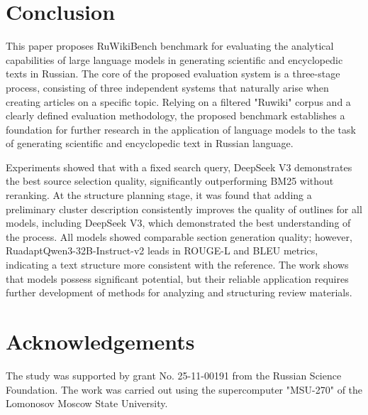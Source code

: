 \documentclass{superfri}
\begin{document}
\section*{Conclusion}
This paper proposes RuWikiBench benchmark for evaluating the analytical capabilities of large language models in generating scientific and encyclopedic texts in Russian. 
The core of the proposed evaluation system is a three-stage process, consisting of three independent systems that naturally arise when creating articles on a specific topic. 
Relying on a filtered "Ruwiki" corpus and a clearly defined evaluation methodology, the proposed benchmark establishes a foundation for further research in the application of language models to the 
task of generating scientific and encyclopedic text in Russian language.

Experiments showed that with a fixed search query, DeepSeek V3 demonstrates the best source selection quality, significantly outperforming BM25 without reranking. 
At the structure planning stage, it was found that adding a preliminary cluster description consistently improves the quality of outlines for all models, 
including DeepSeek V3, which demonstrated the best understanding of the process. All models showed comparable section generation quality; 
however, RuadaptQwen3-\allowbreak 32B-\allowbreak Instruct-\allowbreak v2 leads in ROUGE-L and BLEU metrics, indicating a text structure more consistent with the reference. 
The work shows that models possess significant potential, but their reliable application requires further development of methods for analyzing and structuring review materials.

\section*{Acknowledgements}
The study was supported by grant No. 25-11-00191 from the Russian Science Foundation.
The work was carried out using the supercomputer "MSU-270" of the Lomonosov Moscow State University.

\openaccess


\end{document}
